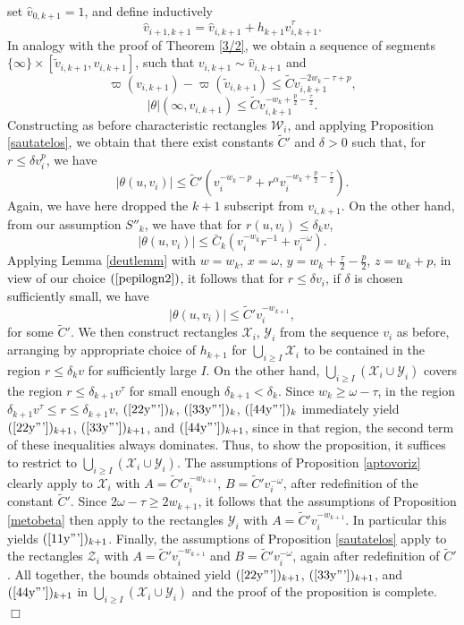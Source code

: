 \documentclass{article}
\begin{document}
set $\hat{v}_{0,k+1}=1$, and define inductively
\[
\hat{v}_{i+1,k+1}=\hat{v}_{i,k+1}+h_{k+1}\hat{v}_{i,k+1}^\tau.
\]
In analogy with the proof of Theorem \ref{3/2}, we obtain 
a sequence of segments  $\{\infty\}\times[\tilde{v}_{i,k+1},v_{i,k+1}]$,
such that $v_{i,k+1}\sim \hat{v}_{i,k+1}$ and
\[
\varpi(v_{i,k+1})-\varpi(\tilde{v}_{i,k+1})\le\tilde{C}v_{i,k+1}^{-2w_k-\tau+p},
\]
\[
|\theta|(\infty, v_{i,k+1})\le \tilde{C}v_{i,k+1}^{-w_k+\frac p2-\frac \tau2}.
\]
Constructing as before characteristic rectangles $\mathcal{W}_i$, and
applying Proposition \ref{sautatelos}, we obtain that there exist
constants $\tilde{C}'$ and $\delta>0$ such that,
for $r\le \delta v_i^p$, we have
\[
|\theta(u,v_i)|\le \tilde{C}'\left(v_i^{-w_k-p}+r^\alpha v_i^{-w_k+\frac p2-\frac\tau2}\right).
\]
Again, we have here dropped the $k+1$ subscript from $v_{i,k+1}$.
On the other hand, 
from our assumption $S''_k$, we have that for $r(u,v_i)\le \delta_k v$,
\[
|\theta(u,v_i)|\le \bar{C}_k\left(v_i^{-w_k}r^{-1}+v_i^{-\omega}\right).
\]
Applying Lemma \ref{deutlemm} 
with $w=w_k$, $x=\omega$, $y=w_k+\frac\tau2-\frac p2$, $z=w_k+p$,
in view of our choice $(\ref{pepilogn2})$, it follows that for
$r\le \delta v_i$, if $\delta$ is chosen sufficiently small, we have
\[
|\theta(u,v_i)|\le \tilde{C}'v_i^{-w_{k+1}},
\]
for some $\tilde{C}'$.
We then construct rectangles $\mathcal{X}_i$, $\mathcal{Y}_i$ 
from the sequence $v_i$ as before, 
arranging by appropriate choice
of $h_{k+1}$ for $\bigcup_{i\ge I}\mathcal{X}_i$ to
be contained in the region $r\le \delta_{k}v$ for sufficiently large $I$. 
On the other hand, $\bigcup_{i\ge I}\left(\mathcal{X}_i\cup\mathcal{Y}_i\right)$ covers 
the region
$r\le \delta_{k+1}v^\tau$ for small enough $\delta_{k+1}<\delta_k$. Since 
$w_k\ge \omega -\tau$, in the region
$\delta_{k+1}v^\tau\le r\le \delta_{k+1}v$, $(\ref{22y'''})_k$, $(\ref{33y'''})_k$, 
$(\ref{44y'''})_k$
immediately yield $(\ref{22y'''})_{k+1}$, $(\ref{33y'''})_{k+1}$, and $(\ref{44y'''})_{k+1}$,
since in that region, the second term of these inequalities always dominates.
Thus, to show the proposition, it suffices to restrict to 
$\bigcup_{i\ge I}\left(\mathcal{X}_i\cup\mathcal{Y}_i\right)$.
The assumptions
of Proposition \ref{aptovoriz} clearly apply to $\mathcal{X}_i$ 
with $A=\tilde{C}'v_i^{-w_{k+1}}$, 
$B=\tilde{C}'v_i^{-\omega}$, after redefinition of the constant
$\tilde{C}'$. 
Since $2\omega-\tau\ge 2w_{k+1}$, it follows that the assumptions
of Proposition \ref{metobeta} then apply to the rectangles $\mathcal{Y}_i$ 
with $A=\tilde{C}'v_i^{-w_{k+1}}$.
In particular this yields $(\ref{11y'''})_{k+1}$. Finally, 
the assumptions of Proposition \ref{sautatelos} apply to the rectangles 
$\mathcal{Z}_i$ with $A=\tilde{C}'v_i^{-w_{k+1}}$
and $B=\tilde{C}'v_i^{-\omega}$, again after redefinition
of $\tilde{C}'$. All together, the bounds
obtained yield 
$(\ref{22y'''})_{k+1}$, $(\ref{33y'''})_{k+1}$, and $(\ref{44y'''})_{k+1}$ in
$\bigcup_{i\ge I}\left(\mathcal{X}_i\cup\mathcal{Y}_i\right)$ and the proof of the
proposition is complete.
$\Box$
\end{document}
